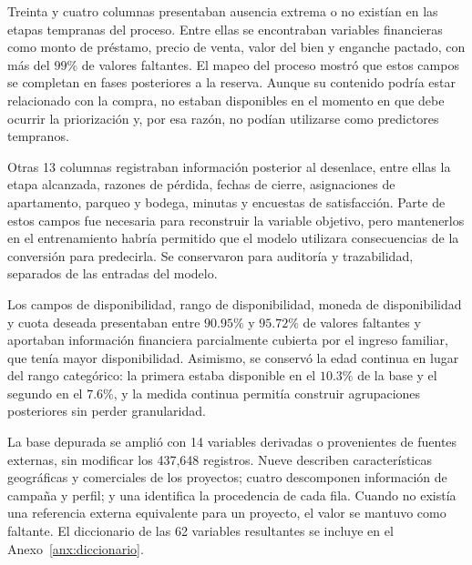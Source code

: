 Treinta y cuatro columnas presentaban ausencia extrema o no existían en las etapas tempranas del proceso. Entre ellas se encontraban variables financieras como monto de préstamo, precio de venta, valor del bien y enganche pactado, con más del $99\%$ de valores faltantes. El mapeo del proceso mostró que estos campos se completan en fases posteriores a la reserva. Aunque su contenido podría estar relacionado con la compra, no estaban disponibles en el momento en que debe ocurrir la priorización y, por esa razón, no podían utilizarse como predictores tempranos.

Otras 13 columnas registraban información posterior al desenlace, entre ellas la etapa alcanzada, razones de pérdida, fechas de cierre, asignaciones de apartamento, parqueo y bodega, minutas y encuestas de satisfacción. Parte de estos campos fue necesaria para reconstruir la variable objetivo, pero mantenerlos en el entrenamiento habría permitido que el modelo utilizara consecuencias de la conversión para predecirla. Se conservaron para auditoría y trazabilidad, separados de las entradas del modelo.

Los campos de disponibilidad, rango de disponibilidad, moneda de disponibilidad y cuota deseada presentaban entre $90.95\%$ y $95.72\%$ de valores faltantes y aportaban información financiera parcialmente cubierta por el ingreso familiar, que tenía mayor disponibilidad. Asimismo, se conservó la edad continua en lugar del rango categórico: la primera estaba disponible en el $10.3\%$ de la base y el segundo en el $7.6\%$, y la medida continua permitía construir agrupaciones posteriores sin perder granularidad.

La base depurada se amplió con 14 variables derivadas o provenientes de fuentes externas, sin modificar los 437{,}648 registros. Nueve describen características geográficas y comerciales de los proyectos; cuatro descomponen información de campaña y perfil; y una identifica la procedencia de cada fila. Cuando no existía una referencia externa equivalente para un proyecto, el valor se mantuvo como faltante. El diccionario de las 62 variables resultantes se incluye en el Anexo~\ref{anx:diccionario}.

